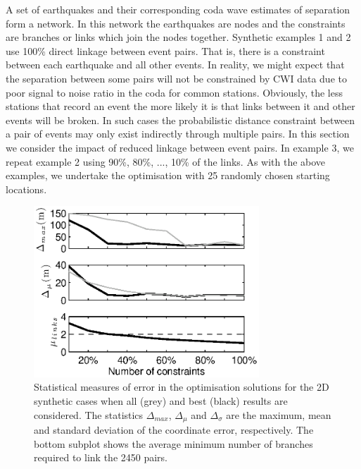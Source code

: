 \documentclass[extra]{gji}
\begin{document}
A set of earthquakes and their corresponding coda wave estimates of
separation form a network. In this network the earthquakes are nodes
and the constraints are branches or links which join the nodes
together. Synthetic examples 1 and 2 use 100\% direct linkage
between event pairs. That is, there is a constraint between each
earthquake and all other events. In reality, we might expect that
the separation between some pairs will not be constrained by CWI
data due to poor signal to noise ratio in the coda for common
stations. Obviously, the less stations that record an event the more
likely it is that links between it and other events will be broken.
In such cases the probabilistic distance constraint between a pair
of events may only exist indirectly through multiple pairs. In this
section we consider the impact of reduced linkage between event
pairs. In example 3, we repeat example 2 using 90\%, 80\%, ..., 10\%
of the links. As with the above examples, we undertake the
optimisation with 25 randomly chosen starting locations.

\begin{figure}
\noindent\includegraphics[width = 20pc]{diags/synth2Dmulti/ressummary_2Dsynth50eq.eps}
\caption{Statistical measures of error in the optimisation solutions for the 2D synthetic cases when all (grey)
and best (black) results are considered. The statistics $\Delta_{max}$, $\Delta_\mu$ and
$\Delta_\sigma$ are the maximum, mean and standard deviation of the coordinate error, respectively.
The bottom subplot shows the average minimum number of branches required to link the 2450 pairs.}
 \label{fig:optimisationresults-2Dsynth}
\end{figure}
\end{document}
